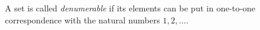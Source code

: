 A set is called \textit{denumerable} if its elements can be put in one-to-one correspondence with the natural numbers $1, 2, \ldots$.
